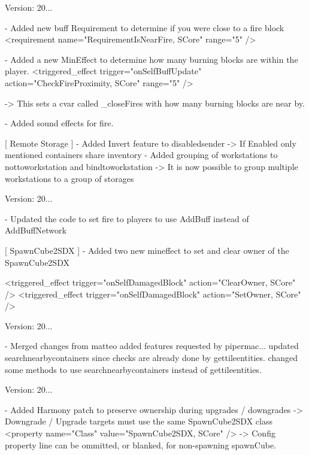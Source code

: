 Version\+: 20... \begin{DoxyVerb}
    - Added new buff Requirement to determine if you were close to a fire block
        <requirement name="RequirementIsNearFire, SCore" range="5" />

    - Added a new MinEffect to determine how many burning blocks are within the player.
        <triggered_effect trigger="onSelfBuffUpdate" action="CheckFireProximity, SCore" range="5"  />       

        -> This sets a cvar called _closeFires with how many burning blocks are near by.

    - Added sound effects for fire.

[ Remote Storage ]
    - Added Invert feature to disabledsender
        -> If Enabled only mentioned containers share inventory
    - Added grouping of workstations to nottoworkstation and bindtoworkstation
        -> It is now possible to group multiple workstations to a group of storages
\end{DoxyVerb}


Version\+: 20... \begin{DoxyVerb}
    - Updated the code to set fire to players to use AddBuff instead of AddBuffNetwork

[ SpawnCube2SDX ]
    - Added two new mineffect to set and clear owner of the SpawnCube2SDX

        <triggered_effect trigger="onSelfDamagedBlock" action="ClearOwner, SCore" />
        <triggered_effect trigger="onSelfDamagedBlock" action="SetOwner, SCore" />
\end{DoxyVerb}
 Version\+: 20... \begin{DoxyVerb}
    - Merged changes from matteo
        added features requested by pipermac...
        updated searchnearbycontainers since checks are already done by gettileentities.
        changed some methods to use searchnearbycontainers instead of gettileentities.
\end{DoxyVerb}
 Version\+: 20... \begin{DoxyVerb}
    - Added Harmony patch to preserve ownership during upgrades / downgrades
        -> Downgrade / Upgrade targets must use the same SpawnCube2SDX class
            <property name="Class" value="SpawnCube2SDX, SCore" />
        -> Config property line can be ommitted, or blanked, for non-spawning spawnCube.
\end{DoxyVerb}


